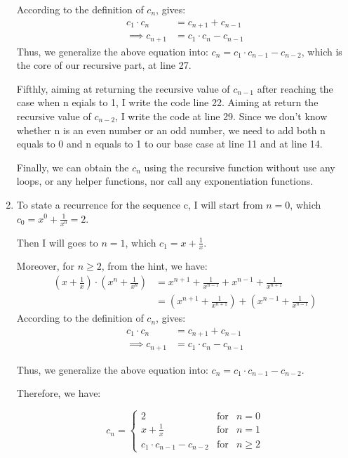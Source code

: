 \documentclass[12pt]{article}
\begin{document}
\begin{enumerate}[label=(\alph*)]
\noindent According to the definition of $c_n$, gives:
\begin{align*}
    c_1 \cdot c_n &= c_{n+1} + c_{n-1} \\
    \implies c_{n+1} &= c_1 \cdot c_n - c_{n-1}
\end{align*}
\noindent Thus, we generalize the above equation into: $c_{n} = c_1 \cdot c_{n-1} - c_{n-2} $, which is the core of our recursive part, at line 27.

\noindent Fifthly, aiming at returning the recursive value of $c_{n-1}$ after reaching the case when n eqials to 1, I write the code line 22.
Aiming at return the recursive value of $c_{n-2}$, I write the code at line 29.
Since we don't know whether n is an even number or an odd number, we need to add both n equals to 0 and n equals to 1 to our base case at line 11 and at line 14.

\noindent Finally, we can obtain the $c_n$ using the recursive function without use any loops, or any helper functions, nor call any exponentiation functions.

    \item To state a recurrence for the sequence c, I will start from $n=0$, which $c_0 = x^0 + \frac{1}{x^0} = 2$.
    
    Then I will goes to $n=1$, which $c_1 = x + \frac{1}{x}$.

    Moreover, for $ n\geq 2$, from the hint, we have:
    \begin{align*}
        (x + \frac{1}{x}) \cdot (x^n + \frac{1}{x^n}) &= x^{n+1} + \frac{1}{x^{n-1}} + x^{n-1} + \frac{1}{x^{n+1}} \\
        &= (x^{n+1} + \frac{1}{x^{n+1}}) + (x^{n-1} + \frac{1}{x^{n-1}})
    \end{align*}
    \noindent According to the definition of $c_n$, gives:
    \begin{align*}
        c_1 \cdot c_n &= c_{n+1} + c_{n-1} \\
        \implies c_{n+1} &= c_1 \cdot c_n - c_{n-1}
    \end{align*}

    Thus, we generalize the above equation into: $c_{n} = c_1 \cdot c_{n-1} - c_{n-2}$.

    Therefore, we have:

    $$c_n =  \left\{ \begin{array}{lcl}
        2 & \mbox{for} & n = 0 \\
        x + \frac{1}{x} & \mbox{for} & n=1 \\
        c_1 \cdot c_{n-1} - c_{n-2} & \mbox{for} & n\geq2
    \end{array}\right. $$


\end{enumerate}
\end{document}
